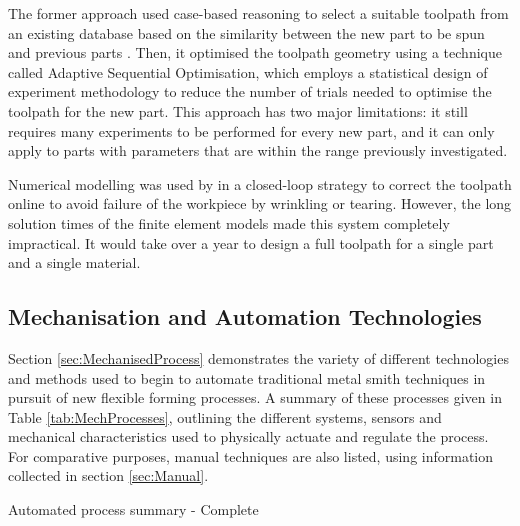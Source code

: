 The former approach used case-based reasoning to select a suitable toolpath from an existing database based on the similarity between the new part to be spun and previous parts \citep{Henkenjohann2005AnProcess}. Then, it optimised the toolpath geometry using a technique called Adaptive Sequential Optimisation, which employs a statistical design of experiment methodology to reduce the number of trials needed to optimise the toolpath for the new part. This approach has two major limitations: it still requires many experiments to be performed for every new part, and it can only apply to parts with parameters that are within the range previously investigated. 

Numerical modelling was used by \citep{Polyblank2015ParametricSpinning} in a closed-loop strategy to correct the toolpath online to avoid failure of the workpiece by wrinkling or tearing. However, the long solution times of the finite element models made this system completely impractical. It would take over a year to design a full toolpath for a single part and a single material. 

\subsection{Mechanisation and Automation Technologies \label{sec:MechandAuto}}
Section \ref{sec:MechanisedProcess} demonstrates the variety of different technologies and methods used to begin to automate traditional metal smith techniques in pursuit of new flexible forming processes. A summary of these processes given in Table \ref{tab:MechProcesses}, outlining the different systems, sensors and mechanical characteristics used to physically actuate and regulate the process. For comparative purposes, manual techniques are also listed, using information collected in section \ref{sec:Manual}.

%        

\newpage


\begin{landscape}
\begin{table}[h] 
    \centering
    \resizebox{\linewidth}{!}{
        
        }
    \caption{Automated process summary - Complete}
    \label{tab:MechProcessesOLD}
\end{table}
\end{landscape}

